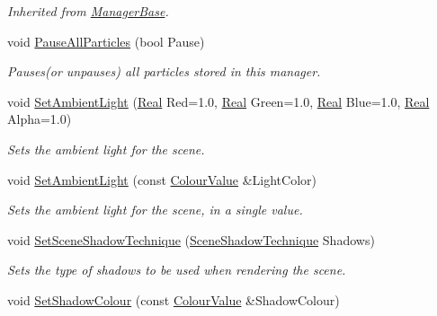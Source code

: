 \begin{DoxyCompactItemize}
\begin{DoxyCompactList}\small\item\em Inherited from \hyperlink{classMezzanine_1_1ManagerBase}{ManagerBase}. \item\end{DoxyCompactList}\item 
void \hyperlink{classMezzanine_1_1SceneManager_ae14c8c163f1d17eeebf698f7326f1840}{PauseAllParticles} (bool Pause)
\begin{DoxyCompactList}\small\item\em Pauses(or unpauses) all particles stored in this manager. \item\end{DoxyCompactList}\item 
void \hyperlink{classMezzanine_1_1SceneManager_ae4b889a919e490edcc3a7d0c32135a82}{SetAmbientLight} (\hyperlink{namespaceMezzanine_a726731b1a7df72bf3583e4a97282c6f6}{Real} Red=1.0, \hyperlink{namespaceMezzanine_a726731b1a7df72bf3583e4a97282c6f6}{Real} Green=1.0, \hyperlink{namespaceMezzanine_a726731b1a7df72bf3583e4a97282c6f6}{Real} Blue=1.0, \hyperlink{namespaceMezzanine_a726731b1a7df72bf3583e4a97282c6f6}{Real} Alpha=1.0)
\begin{DoxyCompactList}\small\item\em Sets the ambient light for the scene. \item\end{DoxyCompactList}\item 
void \hyperlink{classMezzanine_1_1SceneManager_a887c8fb632f4e64b5aec59900ec545aa}{SetAmbientLight} (const \hyperlink{classMezzanine_1_1ColourValue}{ColourValue} \&LightColor)
\begin{DoxyCompactList}\small\item\em Sets the ambient light for the scene, in a single value. \item\end{DoxyCompactList}\item 
void \hyperlink{classMezzanine_1_1SceneManager_ae487633b59779be0bd63de98c4656f6d}{SetSceneShadowTechnique} (\hyperlink{classMezzanine_1_1SceneManager_a8149cd1ec188e0d57935d71c6a7134c6}{SceneShadowTechnique} Shadows)
\begin{DoxyCompactList}\small\item\em Sets the type of shadows to be used when rendering the scene. \item\end{DoxyCompactList}\item 
void \hyperlink{classMezzanine_1_1SceneManager_a8bc4a68f885b85a3a023d632d932de65}{SetShadowColour} (const \hyperlink{classMezzanine_1_1ColourValue}{ColourValue} \&ShadowColour)

\end{DoxyCompactItemize}

